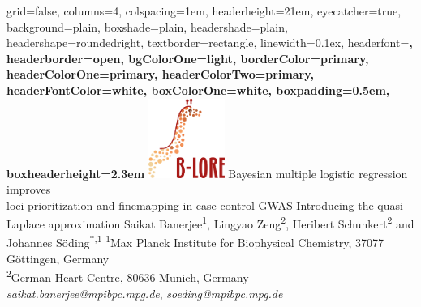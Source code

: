 \documentclass[a0paper,portrait,debug]{baposter}
\begin{document}
\setlength{\belowdisplayskip}{0pt} 
\setlength{\belowdisplayshortskip}{0pt} 
\setlength{\abovedisplayskip}{0pt} 
\setlength{\abovedisplayshortskip}{0pt}


\begin{poster}
{
%
%
	grid=false,
	columns=4,
	colspacing=1em,				%
	headerheight=21em, 				%
	eyecatcher=true,
	background=plain,
  	boxshade=plain,
	headershade=plain,  	
	headershape=roundedright,		%
	textborder=rectangle,			%
	linewidth=0.1ex,				%
        headerfont=\rmfamily\bfseries\large,
	headerborder=open,
	bgColorOne=light, 
	borderColor=primary,
	headerColorOne=primary,
	headerColorTwo=primary,
	headerFontColor=white,
	boxColorOne=white,
	boxpadding=0.5em,					%
	boxheaderheight=2.3em				%
}
{\includegraphics[height=7em]{blore_logo_color_300ppi.png}} %
{\color{primary}Bayesian multiple logistic regression improves\\loci prioritization and finemapping in case-control GWAS}
{Introducing the quasi-Laplace approximation}
{Saikat Banerjee\textsuperscript{1}, Lingyao Zeng\textsuperscript{2}, Heribert Schunkert\textsuperscript{2} and Johannes S\"oding\textsuperscript{*,1}} %
{
  \textsuperscript{1}Max Planck Institute for Biophysical Chemistry, 37077 G\"ottingen, Germany\\[0.2em]
  \textsuperscript{2}German Heart Centre, 80636 Munich, Germany\\[0.5em]
  {\color{primary} {\LARGE \faEnvelopeSquare} \hspace{0.2em}\emph{saikat.banerjee@mpibpc.mpg.de}, \emph{soeding@mpibpc.mpg.de}}\\[0.5em]
}
\end{poster}
\end{document}
